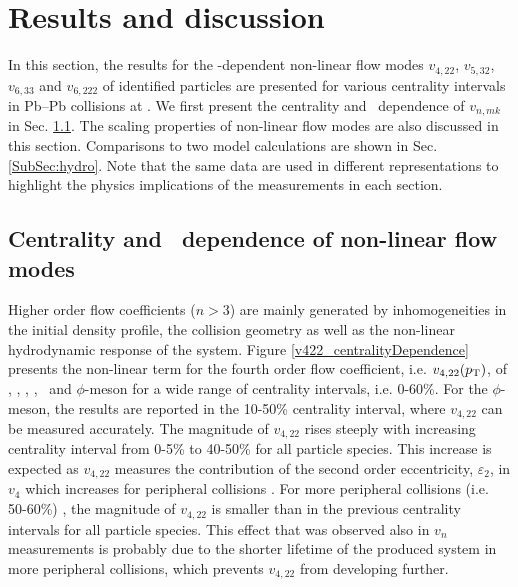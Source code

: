 \newpage

\section{Results and discussion}
\label{Sec:Results}

In this section, the results for the \pT-dependent non-linear flow modes $v_{4,22}$, $v_{5,32}$, $v_{6,33}$ and $v_{6,222}$ of identified particles are presented for various centrality intervals in Pb--Pb collisions at \sNN. We first present the centrality and \pT~dependence of $v_{n,mk}$ in Sec. \ref{SubSec:pTdependence}. The scaling properties of non-linear flow modes are also discussed in this section. Comparisons to two model calculations are shown in Sec. \ref{SubSec:hydro}. Note that the same data are used in different representations to highlight the physics implications of the measurements in each section. 

\subsection{Centrality and \pT~dependence of non-linear flow modes}
\label{SubSec:pTdependence}

Higher order flow coefficients ($n>3$) are mainly generated by inhomogeneities in the initial density profile, the collision geometry as well as the non-linear hydrodynamic response of the system. Figure \ref{v422_centralityDependence} presents the non-linear term for the fourth order flow coefficient, i.e. $v_{4,22}(p_{\rm{T}})$, of \pion, \kaon, \proton, \lambdas, \Ks~and $\phi$-meson for a wide range of centrality intervals, i.e. 0-60\%. For the $\phi$-meson, the results are reported in the 10-50\% centrality interval, where $v_{4,22}$ can be measured accurately. The magnitude of $v_{4,22}$ rises steeply with increasing centrality interval from 0-5\% to 40-50\% for all particle species. This increase is expected as $v_{4,22}$ measures the contribution of the second order eccentricity, $\varepsilon_{2}$, in $v_{4}$ which increases for peripheral collisions \cite{Alver:2010gr}. For more peripheral collisions (i.e. 50-60\%) , the magnitude of $v_{4,22}$ is smaller than in the previous centrality intervals for all particle species. This effect that was observed also in $v_n$ measurements is probably due to the shorter lifetime of the produced system in more peripheral collisions, which prevents $v_{4,22}$ from developing further. 


